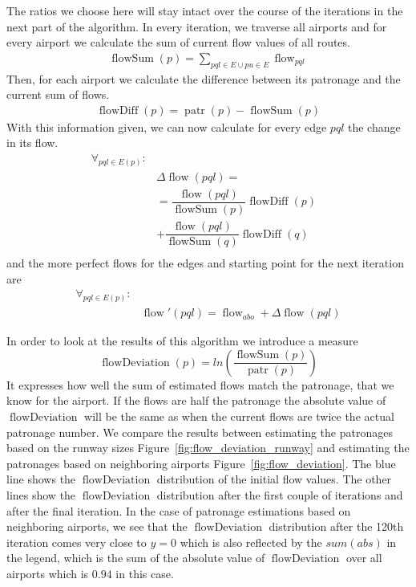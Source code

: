 \documentclass[twocolumn]{tum-article}
\DeclareMathOperator{\patronage}{patr}
\DeclareMathOperator{\flow}{flow}
\DeclareMathOperator{\flowSum}{flowSum}
\DeclareMathOperator{\flowDeviation}{flowDeviation}
\DeclareMathOperator{\flowDiff}{flowDiff}
\begin{document}
The ratios we choose here will stay intact over the course of the iterations in the next part of the algorithm.
In every iteration, we traverse all airports and for every airport we calculate the sum of current flow values of all routes. 
\begin{equation}
\begin{aligned}
\flowSum(p) = \displaystyle\sum_{pql \in E \cup pu \in E}\flow_{pql}
\end{aligned}
\end{equation}
Then, for each airport we calculate the difference between its patronage and the current sum of flows.
\begin{equation}
\begin{aligned}
\flowDiff(p) = \patronage(p) - \flowSum(p) 
\end{aligned}
\end{equation}
With this information given, we can now calculate for every edge $pql$ the change in its flow. 
\begin{equation}
\begin{aligned}
\forall_{pql \in E(p)}: & \\
& \Delta \flow(pql) = & \\ 
& ={} \dfrac{\flow(pql)}{\flowSum(p)}\flowDiff(p) \\
& +{} \dfrac{\flow(pql)}{\flowSum(q)}\flowDiff(q) \\
\end{aligned}
\end{equation}
and the more perfect flows for the edges and starting point for the next iteration are
\begin{equation}
\begin{aligned}
\forall_{pql \in E(p)}: & \\
& \flow'(pql) = \flow_{abo} + \Delta \flow(pql)
\end{aligned}
\end{equation}

In order to look at the results of this algorithm we introduce a measure 
\begin{equation}
\flowDeviation(p) = ln\left(\dfrac{\flowSum(p)}{\patronage(p)}\right)
\end{equation}
It expresses how well the sum of estimated flows match the patronage, that we know for the airport. If the flows are half the patronage the absolute value of $\flowDeviation$ will be the same as when the current flows are twice the actual patronage number. 
We compare the results between estimating the patronages based on the runway sizes Figure~\ref{fig:flow_deviation_runway} and estimating the patronages based on neighboring airports Figure~\ref{fig:flow_deviation}. 
The blue line shows the $\flowDeviation$ distribution of the initial flow values.
The other lines show the $\flowDeviation$ distribution after the first couple of iterations and after the final iteration. 
In the case of patronage estimations based on neighboring airports, we see that the $\flowDeviation$ distribution after the 120th iteration comes very close to $y=0$ which is also reflected by the $sum(abs)$ in the legend, which is the sum of the absolute value of $\flowDeviation$ over all airports which is $0.94$ in this case.
\end{document}

